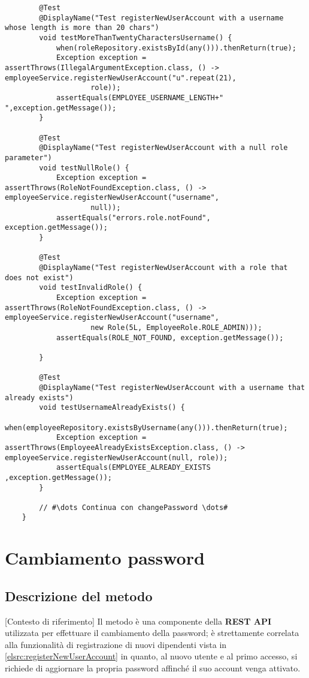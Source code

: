 \begin{verbatim}
		@Test
		@DisplayName("Test registerNewUserAccount with a username whose length is more than 20 chars")
		void testMoreThanTwentyCharactersUsername() {
			when(roleRepository.existsById(any())).thenReturn(true);
			Exception exception = assertThrows(IllegalArgumentException.class, () -> employeeService.registerNewUserAccount("u".repeat(21),
					role));
			assertEquals(EMPLOYEE_USERNAME_LENGTH+" ",exception.getMessage());
		}

		@Test
		@DisplayName("Test registerNewUserAccount with a null role parameter")
		void testNullRole() {
			Exception exception = assertThrows(RoleNotFoundException.class, () -> employeeService.registerNewUserAccount("username",
					null));
			assertEquals("errors.role.notFound", exception.getMessage());
		}

		@Test
		@DisplayName("Test registerNewUserAccount with a role that does not exist")
		void testInvalidRole() {
			Exception exception = assertThrows(RoleNotFoundException.class, () -> employeeService.registerNewUserAccount("username",
					new Role(5L, EmployeeRole.ROLE_ADMIN)));
			assertEquals(ROLE_NOT_FOUND, exception.getMessage());

		}

		@Test
		@DisplayName("Test registerNewUserAccount with a username that already exists")
		void testUsernameAlreadyExists() {
			when(employeeRepository.existsByUsername(any())).thenReturn(true);
			Exception exception = assertThrows(EmployeeAlreadyExistsException.class, () -> employeeService.registerNewUserAccount(null, role));
			assertEquals(EMPLOYEE_ALREADY_EXISTS ,exception.getMessage());
		}

		// #\dots Continua con changePassword \dots#
	}
\end{verbatim}

\section{Cambiamento password}
\subsection{Descrizione del metodo}[Contesto di riferimento]
Il metodo  è una componente della \textbf{REST API} utilizzata per effettuare
il cambiamento della password; è strettamente correlata alla funzionalità di registrazione di nuovi
dipendenti vista in \autoref{elsrc:registerNewUserAccount} in quanto, al nuovo utente e al primo accesso,
si richiede di aggiornare la propria password affinché il suo account venga attivato.

